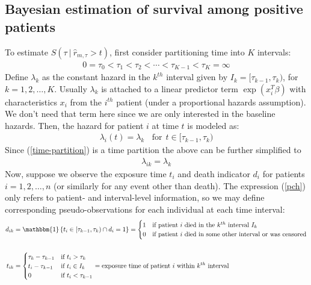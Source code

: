 \documentclass{article}
\begin{document}
\subsection{Bayesian estimation of survival among positive patients}

To estimate $S\left(\tau \ | \ \widehat{r}_{m, \tau} > t \right)$, first consider partitioning time into $K$ intervals:
\begin{align}
    0 = \tau_0 < \tau_1 < \tau_2 < \cdots < \tau_{K-1} < \tau_K = \infty \label{time-partition}
\end{align}
Define $\lambda_k$ as the constant hazard in the $k^{th}$ interval given by $I_k = [\tau_{k-1}, \tau_{k})$, for $k=1, 2, \dots, K$.
Usually $\lambda_k$ is attached to a linear predictor term $\exp\left(x_i^T\beta\right)$ with characteristics $x_i$ from the $i^{th}$
patient (under a proportional hazards assumption). We don't need that term here since we are only interested in the baseline hazards.
 Then, the hazard for 
patient $i$ at time $t$ is modeled as:
\begin{align*}
    \lambda_i(t) = \lambda_k \ \ \ \ \textrm{for} \ \  t \in [\tau_{k-1}, \tau_k)
\end{align*}
Since (\ref{time-partition}) is a time partition the above can be further simplified to 
\begin{align}
    \lambda_{ik} = \lambda_k \label{pch}
\end{align}
Now, suppose we observe the exposure time $t_i$ and death indicator $d_i$ for patients $i=1,2,\dots, n$ (or similarly for any event other than death). The expression
(\ref*{pch}) only refers to patient- and interval-level information, so we may define corresponding pseudo-observations for each
individual at each time interval:
\begin{align}
    d_{ik} &= \mathbbm{1}\left\{t_i \in [\tau_{k-1}, \tau_k) \cap d_i = 1 \right\} = \begin{cases}
        1&\textrm{if patient $i$ died in the $k^{th}$ interval $I_k$}\\
        0&\textrm{if patient $i$ died in some other interval or was censored}
    \end{cases} \nonumber\\
    \label{pseudo-obs}\\
    t_{ik} &= \begin{cases}
        \tau_k - \tau_{k-1} &\textrm{if $t_i>\tau_k$}\\
        t_i - \tau_{k-1} &\textrm{if $t_i \in I_k$}\\
        0&\textrm{if $t_i < \tau_{k-1}$}
    \end{cases} = \textrm{exposure time of patient $i$ within $k^{th}$ interval}
    \nonumber
\end{align}
\end{document}
